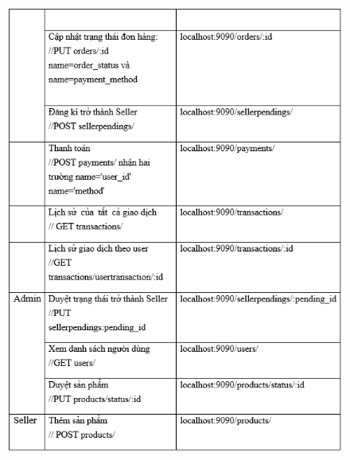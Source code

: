 \documentclass{article}
\begin{document}
{{{{{{{{{{{{{{{{{{\begin{center}
\begin{figure}[htp]
			
		\end{figure}
	\end{center}
}
\newpage
{\large 
	\begin{center}
		\begin{figure}[htp]
			\begin{center}
				\includegraphics[scale=.900]{anh29.png}
			\end{center}
			

\end{figure}
\end{center}}}}}}}}}}}}}}}}}}}
\end{document}

